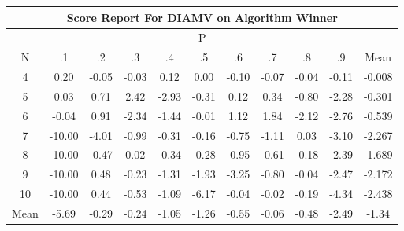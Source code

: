 \documentclass[11pt,a4paper]{report}
\begin{document}
\begin{longtable}{ | c || c | c | c | c | c | c | c | c | c || c |}
\hline
\multicolumn{11}{|c|}{ Score Report For DIAMV on Algorithm Winner} \\
\hline
\multicolumn{11}{|c|}{ P } \\
\hline
N & .1 & .2 & .3 & .4 & .5 & .6 & .7 & .8 & .9 & Mean\\
 \hline
 \hline
 \endhead
  4 &  \cellcolor[HTML]{F7F7FF} 0.20 &  \cellcolor[HTML]{FFFFFF} -0.05 &  \cellcolor[HTML]{FFFFFF} -0.03 &  \cellcolor[HTML]{FFFFFF} 0.12 &  \cellcolor[HTML]{FFFFFF} 0.00 &  \cellcolor[HTML]{FFFFFF} -0.10 &  \cellcolor[HTML]{FFFFFF} -0.07 &  \cellcolor[HTML]{FFFFFF} -0.04 &  \cellcolor[HTML]{FFFFFF} -0.11 & -0.008 \\
  5 &  \cellcolor[HTML]{FFFFFF} 0.03 &  \cellcolor[HTML]{EFEFFF} 0.71 &  \cellcolor[HTML]{BFBFFF} 2.42 &  \cellcolor[HTML]{FFB7B7} -2.93 &  \cellcolor[HTML]{FFF7F7} -0.31 &  \cellcolor[HTML]{FFFFFF} 0.12 &  \cellcolor[HTML]{F7F7FF} 0.34 &  \cellcolor[HTML]{FFE7E7} -0.80 &  \cellcolor[HTML]{FFC7C7} -2.28 & -0.301 \\
  6 &  \cellcolor[HTML]{FFFFFF} -0.04 &  \cellcolor[HTML]{E7E7FF} 0.91 &  \cellcolor[HTML]{FFC7C7} -2.34 &  \cellcolor[HTML]{FFD7D7} -1.44 &  \cellcolor[HTML]{FFFFFF} -0.01 &  \cellcolor[HTML]{DFDFFF} 1.12 &  \cellcolor[HTML]{CFCFFF} 1.84 &  \cellcolor[HTML]{FFC7C7} -2.12 &  \cellcolor[HTML]{FFB7B7} -2.76 & -0.539 \\
  7 &  \cellcolor[HTML]{FF0000} -10.00 &  \cellcolor[HTML]{FF9797} -4.01 &  \cellcolor[HTML]{FFE7E7} -0.99 &  \cellcolor[HTML]{FFF7F7} -0.31 &  \cellcolor[HTML]{FFFFFF} -0.16 &  \cellcolor[HTML]{FFEFEF} -0.75 &  \cellcolor[HTML]{FFE7E7} -1.11 &  \cellcolor[HTML]{FFFFFF} 0.03 &  \cellcolor[HTML]{FFAFAF} -3.10 & -2.267 \\
  8 &  \cellcolor[HTML]{FF0000} -10.00 &  \cellcolor[HTML]{FFF7F7} -0.47 &  \cellcolor[HTML]{FFFFFF} 0.02 &  \cellcolor[HTML]{FFF7F7} -0.34 &  \cellcolor[HTML]{FFF7F7} -0.28 &  \cellcolor[HTML]{FFE7E7} -0.95 &  \cellcolor[HTML]{FFEFEF} -0.61 &  \cellcolor[HTML]{FFF7F7} -0.18 &  \cellcolor[HTML]{FFBFBF} -2.39 & -1.689 \\
  9 &  \cellcolor[HTML]{FF0000} -10.00 &  \cellcolor[HTML]{EFEFFF} 0.48 &  \cellcolor[HTML]{FFF7F7} -0.23 &  \cellcolor[HTML]{FFDFDF} -1.31 &  \cellcolor[HTML]{FFCFCF} -1.93 &  \cellcolor[HTML]{FFAFAF} -3.25 &  \cellcolor[HTML]{FFE7E7} -0.80 &  \cellcolor[HTML]{FFFFFF} -0.04 &  \cellcolor[HTML]{FFBFBF} -2.47 & -2.172 \\
  10 &  \cellcolor[HTML]{FF0000} -10.00 &  \cellcolor[HTML]{F7F7FF} 0.44 &  \cellcolor[HTML]{FFEFEF} -0.53 &  \cellcolor[HTML]{FFE7E7} -1.09 &  \cellcolor[HTML]{FF6868} -6.17 &  \cellcolor[HTML]{FFFFFF} -0.04 &  \cellcolor[HTML]{FFFFFF} -0.02 &  \cellcolor[HTML]{FFF7F7} -0.19 &  \cellcolor[HTML]{FF8F8F} -4.34 & -2.438 \\
 \hline
 \hline
Mean &  \cellcolor[HTML]{FF7070} -5.69 &  \cellcolor[HTML]{FFF7F7} -0.29 &  \cellcolor[HTML]{FFF7F7} -0.24 &  \cellcolor[HTML]{FFE7E7} -1.05 &  \cellcolor[HTML]{FFDFDF} -1.26 &  \cellcolor[HTML]{FFEFEF} -0.55 &  \cellcolor[HTML]{FFFFFF} -0.06 &  \cellcolor[HTML]{FFF7F7} -0.48 &  \cellcolor[HTML]{FFBFBF} -2.49 &  \cellcolor[HTML]{FFDFDF} -1.34
\end{longtable}
\end{document}
